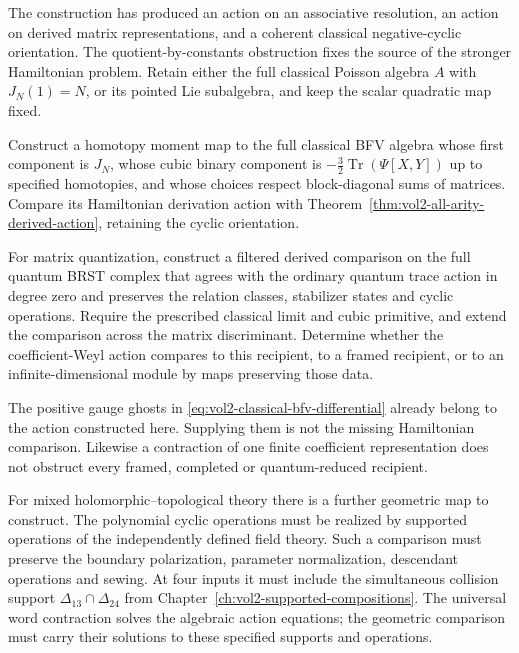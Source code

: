 The construction has produced an action on an associative
resolution, an action on derived matrix representations,
and a coherent classical negative-cyclic orientation.
The quotient-by-constants obstruction fixes the source of
the stronger Hamiltonian problem. Retain either the full
classical Poisson algebra $A$ with $J_N(1)=N$, or its pointed
Lie subalgebra, and keep the scalar quadratic map fixed.

\begin{problem}\label{prob:vol2-derived-hamiltonian-moment-map}
Construct a homotopy moment map to the full classical BFV
algebra whose first component is $J_N$, whose cubic binary
component is $-\tfrac32\operatorname{Tr}(\Psi[X,Y])$ up to
specified homotopies, and whose choices respect block-diagonal
sums of matrices. Compare its Hamiltonian derivation action
with Theorem~\ref{thm:vol2-all-arity-derived-action}, retaining
the cyclic orientation.

For matrix quantization, construct a filtered derived
comparison on the full quantum BRST complex that agrees
with the ordinary quantum trace action in degree zero and
preserves the relation classes, stabilizer states and cyclic
operations. Require the prescribed classical limit and cubic
primitive, and extend the comparison across the matrix
discriminant. Determine whether the coefficient-Weyl action
compares to this recipient, to a framed recipient, or to an
infinite-dimensional module by maps preserving those data.
\end{problem}

The positive gauge ghosts in
\eqref{eq:vol2-classical-bfv-differential} already belong to
the action constructed here. Supplying them is not the
missing Hamiltonian comparison. Likewise a contraction of
one finite coefficient representation does not obstruct
every framed, completed or quantum-reduced recipient.

For mixed holomorphic--topological theory there is a further
geometric map to construct. The polynomial cyclic operations
must be realized by supported operations of the independently
defined field theory. Such a comparison must preserve the
boundary polarization, parameter normalization, descendant
operations and sewing. At four inputs it must include the
simultaneous collision support
$\Delta_{13}\cap\Delta_{24}$ from
Chapter~\ref{ch:vol2-supported-compositions}.
The universal word contraction solves the algebraic action
equations; the geometric comparison must carry their
solutions to these specified supports and operations.
